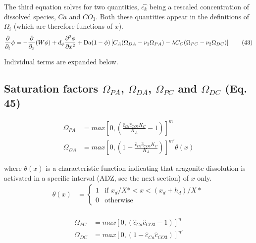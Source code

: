 \documentclass[10pt, letterpaper]{article}
\begin{document}
The third equation solves for two quantities, $\hat{c_k}$ being a rescaled concentration of dissolved species, $Ca$ and $CO_3$. Both these quantities appear in the definitions of $\Omega_i$ (which are therefore functions of $x$).
\begin{equation}
\frac{\partial}{\partial_t} \phi = - \frac{\partial}{\partial_x}(W\phi) + d_{\phi} \frac{\partial^2\phi}{\partial x^2} + \operatorname{Da}(1 - \phi) \left[C_A(\Omega_{DA} - \nu_1\Omega_{PA}) - \\\lambda C_C(\Omega_{PC} - \nu_2\Omega_{DC})\right] \tag{43}
\end{equation}

Individual terms are expanded below.

\subsection{Saturation factors $\Omega_{PA}$, $\Omega_{DA}$, $\Omega_{PC}$ and $\Omega_{DC}$ (Eq. 45)} 

\begin{equation}
\begin{align}
\Omega_{PA} &= max\left[0, \left(\frac{\hat{c}_{Ca} \hat{c}_{CO3} K_C}{K_A} - 1 \right)\right]^m \nonumber \\
\Omega_{DA} &= max\left[0, \left(1 - \frac{\hat{c}_{Ca} \hat{c}_{CO3} K_C}{K_A} \right)\right] ^{m'} \theta(x) \nonumber 
\end{align}
\end{equation}

where $\theta(x)$ is a characteristic function indicating that aragonite dissolution is activated in a specific interval (ADZ, see the next section) of $x$ only. 
\begin{equation}
\begin{align}
\theta(x) &= \begin{cases}
    1  &\mbox{if } x_d/X* < x < (x_d + h_d)/X* \\
    0  &\mbox{otherwise } 
\end{cases} \\
\end{align}
\end{equation}

\begin{equation}
\begin{align}
\Omega_{PC} &= max\left[0, (\hat{c}_{Ca} \hat{c}_{CO3}  - 1 )\right] ^n \nonumber  \\
\Omega_{DC} &= max\left[0, (1 - \hat{c}_{Ca} \hat{c}_{CO3})\right]^{n'} \nonumber
\end{align}
\end{equation}
\end{document}
